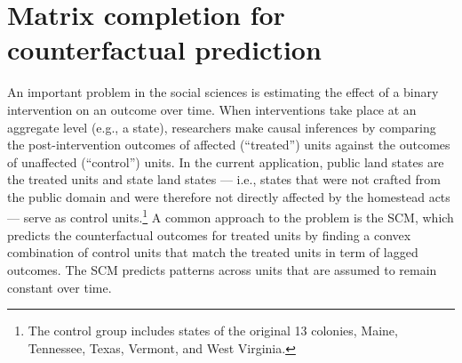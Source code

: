 \documentclass[12pt]{article}
\begin{document}

\section{Matrix completion for counterfactual prediction} \label{estimation}

An important problem in the social sciences is estimating the effect of a binary intervention on an outcome over time. When interventions take place at an aggregate level (e.g., a state), researchers make causal inferences by comparing the post-intervention outcomes of affected (``treated'') units against the outcomes of unaffected  (``control'') units. In the current application, public land states are the treated units and state land states --- i.e., states that were not crafted from the public domain and were therefore not directly affected by the homestead acts --- serve as control units.\footnote{The control group includes states of the original 13 colonies, Maine, Tennessee, Texas, Vermont, and West Virginia.} A common approach to the problem is the SCM, which predicts the counterfactual outcomes for treated units by finding a convex combination of control units that match the treated units in term of lagged outcomes. The SCM predicts patterns across units that are assumed to remain constant over time. 
\end{document}
